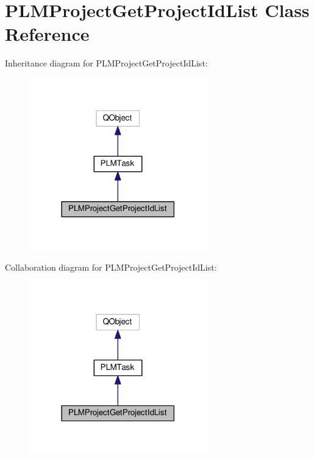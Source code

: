 \hypertarget{class_p_l_m_project_get_project_id_list}{}\section{P\+L\+M\+Project\+Get\+Project\+Id\+List Class Reference}
\label{class_p_l_m_project_get_project_id_list}


Inheritance diagram for P\+L\+M\+Project\+Get\+Project\+Id\+List\+:\nopagebreak
\begin{figure}[H]
\begin{center}
\leavevmode
\includegraphics[width=218pt]{class_p_l_m_project_get_project_id_list__inherit__graph}
\end{center}
\end{figure}


Collaboration diagram for P\+L\+M\+Project\+Get\+Project\+Id\+List\+:\nopagebreak
\begin{figure}[H]
\begin{center}
\leavevmode
\includegraphics[width=218pt]{class_p_l_m_project_get_project_id_list__coll__graph}
\end{center}
\end{figure}
